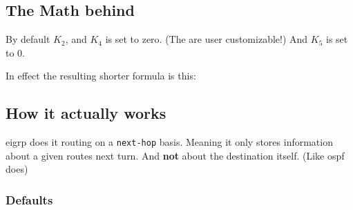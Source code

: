 \subsection[Math]{The Math behind}


By default $K_2$, and $K_4$ is set to zero. (The are user customizable!) And $K_5$ is set to 0.

In effect the resulting shorter formula is this:


\subsection{How it actually works}

\gls{eigrp} does it routing on a \texttt{next-hop} basis. Meaning it only stores information about a given routes next turn. And \textbf{not} about the destination itself. (Like \gls{ospf} does)

\subsubsection{Defaults}

